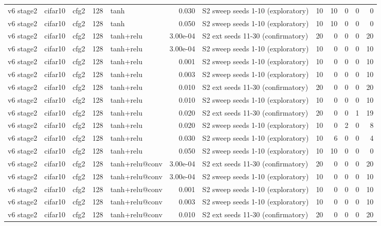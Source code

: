 \begin{table}[htbp]
{\begin{tabular}{@{}lllrlrlrrrrr@{}}
v6 stage2 & cifar10 & cfg2 & 128 & tanh & 0.030 & S2 sweep seeds 1-10 (exploratory) & 10 & 10 & 0 & 0 & 0 \\
v6 stage2 & cifar10 & cfg2 & 128 & tanh & 0.050 & S2 sweep seeds 1-10 (exploratory) & 10 & 10 & 0 & 0 & 0 \\
v6 stage2 & cifar10 & cfg2 & 128 & tanh+relu & 3.00e-04 & S2 ext seeds 11-30 (confirmatory) & 20 & 0 & 0 & 0 & 20 \\
v6 stage2 & cifar10 & cfg2 & 128 & tanh+relu & 3.00e-04 & S2 sweep seeds 1-10 (exploratory) & 10 & 0 & 0 & 0 & 10 \\
v6 stage2 & cifar10 & cfg2 & 128 & tanh+relu & 0.001 & S2 sweep seeds 1-10 (exploratory) & 10 & 0 & 0 & 0 & 10 \\
v6 stage2 & cifar10 & cfg2 & 128 & tanh+relu & 0.003 & S2 sweep seeds 1-10 (exploratory) & 10 & 0 & 0 & 0 & 10 \\
v6 stage2 & cifar10 & cfg2 & 128 & tanh+relu & 0.010 & S2 ext seeds 11-30 (confirmatory) & 20 & 0 & 0 & 0 & 20 \\
v6 stage2 & cifar10 & cfg2 & 128 & tanh+relu & 0.010 & S2 sweep seeds 1-10 (exploratory) & 10 & 0 & 0 & 0 & 10 \\
v6 stage2 & cifar10 & cfg2 & 128 & tanh+relu & 0.020 & S2 ext seeds 11-30 (confirmatory) & 20 & 0 & 0 & 1 & 19 \\
v6 stage2 & cifar10 & cfg2 & 128 & tanh+relu & 0.020 & S2 sweep seeds 1-10 (exploratory) & 10 & 0 & 2 & 0 & 8 \\
v6 stage2 & cifar10 & cfg2 & 128 & tanh+relu & 0.030 & S2 sweep seeds 1-10 (exploratory) & 10 & 6 & 0 & 0 & 4 \\
v6 stage2 & cifar10 & cfg2 & 128 & tanh+relu & 0.050 & S2 sweep seeds 1-10 (exploratory) & 10 & 10 & 0 & 0 & 0 \\
v6 stage2 & cifar10 & cfg2 & 128 & tanh+relu@conv & 3.00e-04 & S2 ext seeds 11-30 (confirmatory) & 20 & 0 & 0 & 0 & 20 \\
v6 stage2 & cifar10 & cfg2 & 128 & tanh+relu@conv & 3.00e-04 & S2 sweep seeds 1-10 (exploratory) & 10 & 0 & 0 & 0 & 10 \\
v6 stage2 & cifar10 & cfg2 & 128 & tanh+relu@conv & 0.001 & S2 sweep seeds 1-10 (exploratory) & 10 & 0 & 0 & 0 & 10 \\
v6 stage2 & cifar10 & cfg2 & 128 & tanh+relu@conv & 0.003 & S2 sweep seeds 1-10 (exploratory) & 10 & 0 & 0 & 0 & 10 \\
v6 stage2 & cifar10 & cfg2 & 128 & tanh+relu@conv & 0.010 & S2 ext seeds 11-30 (confirmatory) & 20 & 0 & 0 & 0 & 20 \\

\end{tabular}}
\end{table}
